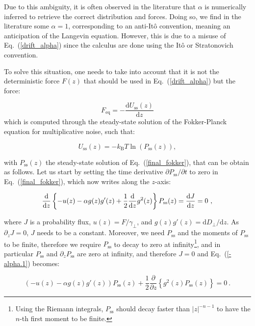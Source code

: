 Due to this ambiguity, it is often observed in the literature that $\alpha$ is numerically inferred to retrieve the correct distribution and forces. Doing so, we find in the literature some $\alpha =1$, corresponding to an anti-Itô convention, meaning an anticipation of the Langevin equation. However, this is due to a misuse of Eq.~(\ref{drift_alpha}) since the calculus are done using the Itô or Stratonovich convention.   

To solve this situation, one needs to take into account that it is not the deterministic force $F(z)$ that should be used in Eq.~(\ref{drift_alpha}) but the force:

\begin{equation}
	F_\mathrm{eq} = - \frac{\mathrm{d}U_\mathrm{ss}(z)}{\mathrm{d}z}
	\label{Feq}
\end{equation}
which is computed through the steady-state solution of the Fokker-Planck equation for multiplicative noise, such that:

\begin{equation}
	U_\mathrm{ss} (z) = - k_\mathrm{B}T \ln (P_\mathrm{ss}(z)),
	\label{Uss}
\end{equation}


with $P_\mathrm{ss}(z)$ the steady-state solution of Eq.~(\ref{final_fokker}), that can be obtain as follows. Let us start by setting the time derivative $\partial P_\mathrm{ss} / \partial t$ to zero in Eq.~(\ref{final_fokker}), which now writes along the $z$-axis:

\begin{equation}
	\frac{\textnormal{d}}{\textnormal{d} z} \left\{ -u(z) - \alpha g(z)g'(z) + \frac{1}{2}\frac{\textnormal{d} }{\textnormal{d} z} g^2(z)  \right\} P_\mathrm{ss}(z)= \frac{\textnormal{d} J}{\textnormal{d} z} = 0~,
	\label{-alpha.1}
\end{equation}

where $J$ is a probability flux, $u(z) = F/\gamma_\bot$, and $g(z)g'(z) = \mathrm{d}D_\bot / \mathrm{d}z $. As $\partial _z J =0$, $J$ needs to be a constant. Moreover, we need $P_\mathrm{ss}$ and the moments of $P_\mathrm{ss}$ to be finite, therefore we require $P_\mathrm{ss}$ to decay to zero at infinity\footnote{Using the Riemann integrals, $P_\mathrm{ss}$ should decay faster than $|z|^{-n-1}$ to have the $n$-th first moment to be finite.}, and in particular $P_\mathrm{ss}$ and $\partial_z P_\mathrm{ss}$ are zero at infinity, and therefore $J=0$ and Eq.~(\ref{-alpha.1}) becomes:

\begin{equation}
	\left(-u(z) - \alpha g(z)g'(z)\right)P_\mathrm{ss}(z) + \frac{1}{2}\frac{\partial}{\partial z} \left\{ g^2(z) P_\mathrm{ss}(z) \right\} =0~.
	\label{-alpha.2}
\end{equation}

